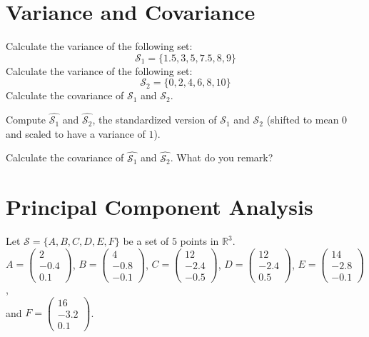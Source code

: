\documentclass[]{article}
\begin{document}
	\section{Variance and Covariance}
	Calculate the variance of the following set:
	$$
	\mathcal{S}_1 = \{ 1.5, 3, 5, 7.5, 8, 9 \}
	$$
	Calculate the variance of the following set:
	$$
	\mathcal{S}_2 = \{ 0, 2, 4, 6, 8, 10 \}
	$$
	Calculate the covariance of $\mathcal{S}_1$ and $\mathcal{S}_2$.
	
	Compute $\hat{\mathcal{S}_1}$ and $\hat{\mathcal{S}_2}$, the standardized version of $\mathcal{S}_1$ and $\mathcal{S}_2$ (shifted to mean $0$ and scaled to have a variance of $1$).
	
	Calculate the covariance of $\hat{\mathcal{S}_1}$ and $\hat{\mathcal{S}_2}$. What do you remark?

	\section{Principal Component Analysis}
	Let $\mathcal{S} = \{ A, B, C, D, E, F \}$ be a set of $5$ points in $\mathbb{R}^3$.\\
	$A = \begin{pmatrix} 2 \\ -0.4 \\ 0.1 \end{pmatrix}$,
	$B = \begin{pmatrix} 4 \\ -0.8 \\ -0.1 \end{pmatrix}$,
	$C = \begin{pmatrix} 12 \\ -2.4 \\ -0.5 \end{pmatrix}$,
	$D = \begin{pmatrix} 12 \\ -2.4 \\ 0.5 \end{pmatrix}$,
	$E = \begin{pmatrix} 14 \\ -2.8 \\ -0.1 \end{pmatrix}$,\\
	and $F = \begin{pmatrix} 16 \\ -3.2 \\ 0.1 \end{pmatrix}$.
	
\end{document}
